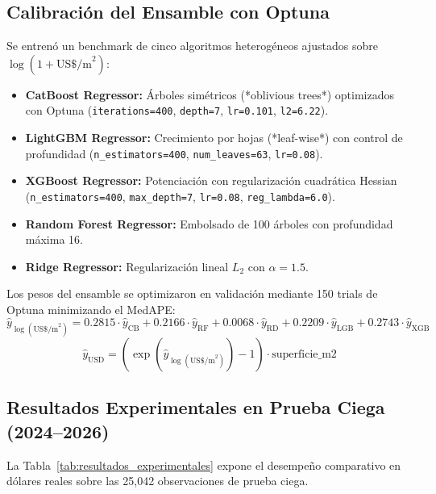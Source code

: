 \documentclass[11pt,a4paper]{article}
\begin{document}
\subsection{Calibración del Ensamble con Optuna}
Se entrenó un benchmark de cinco algoritmos heterogéneos ajustados sobre $\log(1 + \text{US\$/m}^2)$:
\begin{itemize}
    \item \textbf{CatBoost Regressor:} Árboles simétricos (*oblivious trees*) optimizados con Optuna (\texttt{iterations=400}, \texttt{depth=7}, \texttt{lr=0.101}, \texttt{l2=6.22}).
    \item \textbf{LightGBM Regressor:} Crecimiento por hojas (*leaf-wise*) con control de profundidad (\texttt{n\_estimators=400}, \texttt{num\_leaves=63}, \texttt{lr=0.08}).
    \item \textbf{XGBoost Regressor:} Potenciación con regularización cuadrática Hessian (\texttt{n\_estimators=400}, \texttt{max\_depth=7}, \texttt{lr=0.08}, \texttt{reg\_lambda=6.0}).
    \item \textbf{Random Forest Regressor:} Embolsado de 100 árboles con profundidad máxima 16.
    \item \textbf{Ridge Regressor:} Regularización lineal $L_2$ con $\alpha=1.5$.
\end{itemize}
Los pesos del ensamble se optimizaron en validación mediante 150 trials de Optuna minimizando el MedAPE:
\begin{equation}
\hat{y}_{\log(\text{US\$/m}^2)} = 0.2815 \cdot \hat{y}_{\text{CB}} + 0.2166 \cdot \hat{y}_{\text{RF}} + 0.0068 \cdot \hat{y}_{\text{RD}} + 0.2209 \cdot \hat{y}_{\text{LGB}} + 0.2743 \cdot \hat{y}_{\text{XGB}}
\end{equation}
\begin{equation}
\hat{y}_{\text{USD}} = \left( \exp(\hat{y}_{\log(\text{US\$/m}^2)}) - 1 \right) \cdot \text{superficie\_m2}
\end{equation}

\subsection{Resultados Experimentales en Prueba Ciega (2024--2026)}
La Tabla~\ref{tab:resultados_experimentales} expone el desempeño comparativo en dólares reales sobre las 25,042 observaciones de prueba ciega.
\end{document}
